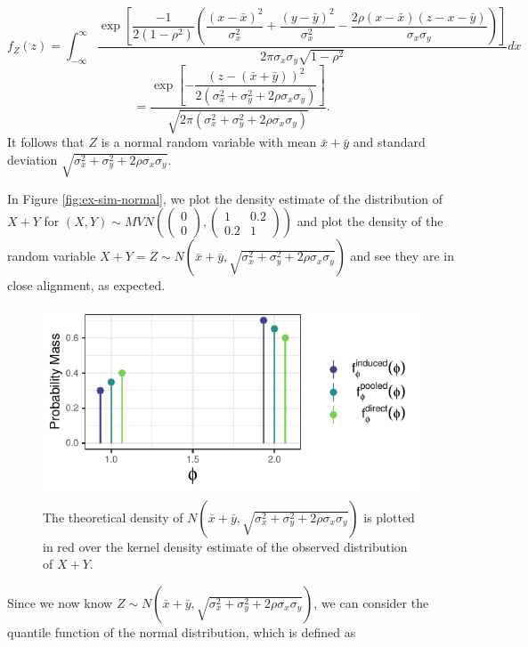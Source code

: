 \documentclass[12pt,twoside]{smiththesis}
\begin{document}
\[f_Z(z)  = \int_{-\infty}^\infty \dfrac{\exp\left[\dfrac{-1}{2(1-\rho^2)} \left( \dfrac{(x-\bar x)^2}{\sigma_x^2}+\dfrac{(y-\bar y)^2}{\sigma_x^2} - \dfrac{2 \rho (x-\bar x)(z-x-\bar y)}{\sigma_x\sigma_y} \right)\right]}{2\pi \sigma_x \sigma_y \sqrt{1- \rho^2}} dx \]
\[=\dfrac{\exp\left[-\dfrac{(z-(\bar x + \bar y ))^2}{2(\sigma^2_x+\sigma^2_y + 2\rho \sigma_x \sigma_y)}\right]}{\sqrt{2\pi(\sigma_x^2 + \sigma_y^2 + 2\rho \sigma_x \sigma_y)}}.\]
It follows that \(Z\) is a normal random variable with mean \(\bar x + \bar y\) and standard deviation \(\sqrt{\sigma_x^2 +\sigma_y^2 + 2 \rho \sigma_x \sigma_y }\).

In Figure \ref{fig:ex-sim-normal}, we plot the density estimate of the distribution of \(X+Y\) for \((X,Y) \sim MVN\left( \begin{pmatrix} 0\\0 \end{pmatrix}, \begin{pmatrix} 1 & 0.2 \\0.2 & 1 \end{pmatrix}\right)\) and plot the density of the random variable \(X+Y = Z \sim N\left(\bar x + \bar y,\sqrt{\sigma_x^2 +\sigma_y^2 + 2 \rho \sigma_x \sigma_y }\right)\) and see they are in close alignment, as expected.
\begin{figure}

{\centering \includegraphics{thesis_files/figure-latex/unnamed-chunk-7-1} 

}

\caption{\label{fig:ex-sim-normal} The theoretical density of $N\left(\bar x + \bar y,\sqrt{\sigma_x^2 +\sigma_y^2 + 2 \rho \sigma_x \sigma_y }\right)$ is plotted in red over the kernel density estimate of the observed distribution of $X+Y$.}\label{fig:unnamed-chunk-7}
\end{figure}
Since we now know \(Z \sim N\left(\bar x + \bar y,\sqrt{\sigma_x^2 +\sigma_y^2 + 2 \rho \sigma_x \sigma_y }\right)\), we can consider the quantile function of the normal distribution, which is defined as
\end{document}
